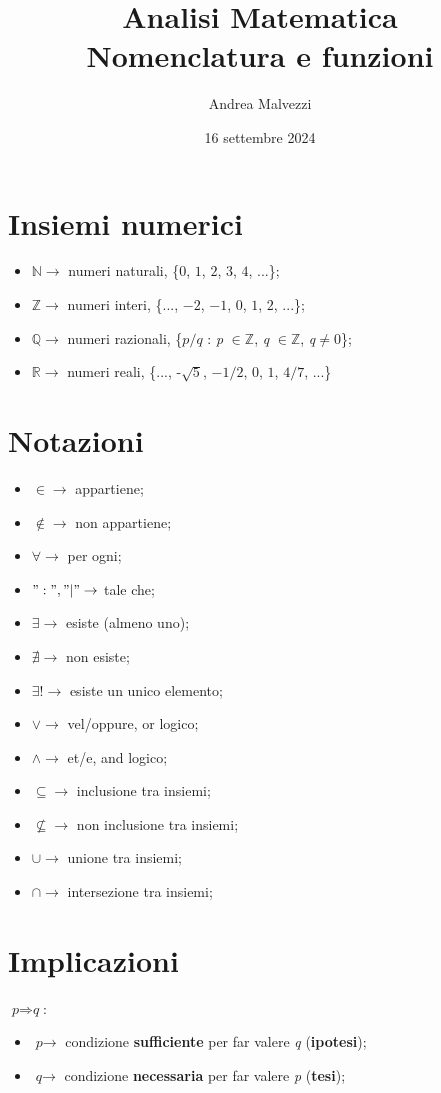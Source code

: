 \documentclass[12pt]{article}
\title{\textbf{Analisi Matematica\\Nomenclatura e funzioni}}
\date{16 settembre 2024}
\author{Andrea Malvezzi}
\begin{document}
\maketitle
\pagebreak
\section{Insiemi numerici}
\begin{itemize}
    \item $\mathbb{N} \rightarrow$ numeri naturali, \{$0$, $1$, $2$, $3$, $4$, ...\};
    \item $\mathbb{Z} \rightarrow$ numeri interi, \{..., $-2$, $-1$, $0$, $1$, $2$, ...\};
    \item $\mathbb{Q} \rightarrow$ numeri razionali, \{$\textit{p}/\textit{q}$ : \textit{p} $\in \mathbb{Z}$, \textit{q} $\in \mathbb{Z}$, \textit{q}$\neq 0$\};
    \item $\mathbb{R} \rightarrow$ numeri reali, \{..., -$\sqrt{5}$, $-1/2$, $0$, $1$, $4/7$, ...\}
\end{itemize}
\section{Notazioni}
\begin{itemize}
    \item $\in \rightarrow$ appartiene;
    \item $\notin \rightarrow$ non appartiene;
    \item $\forall \rightarrow$ per ogni;
    \item $":", "|" \rightarrow$ tale che;
    \item $\exists \rightarrow$ esiste (almeno uno);
    \item $\nexists \rightarrow$ non esiste;
    \item $\exists! \rightarrow$ esiste un unico elemento;
    \item $\lor \rightarrow$ vel/oppure, or logico;
    \item $\land \rightarrow$ et/e, and logico;
    \item $\subseteq \rightarrow$ inclusione tra insiemi;
    \item $\nsubseteq \rightarrow$ non inclusione tra insiemi;
    \item $\cup \rightarrow$ unione tra insiemi;
    \item $\cap \rightarrow$ intersezione tra insiemi;
\end{itemize}
\section{Implicazioni}
$\textit{p} \Rightarrow \textit{q}$:
\begin{itemize}
    \item $\textit{p} \rightarrow$ condizione \textbf{sufficiente} per far valere \textit{q} (\textbf{ipotesi});
    \item $\textit{q} \rightarrow$ condizione \textbf{necessaria} per far valere \textit{p} (\textbf{tesi});
\end{itemize}
\end{document}
